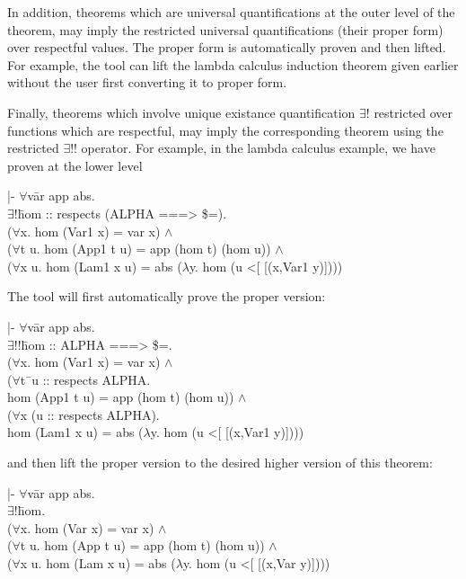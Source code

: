 \documentclass[envcountsame,runningheads]{llncs}
\begin{document}
In addition, theorems which are universal quantifications
at the outer level of the theorem, may
imply the restricted universal quantifications (their proper form)
over respectful values. 
The proper form is automatically proven and then lifted.
For example, the tool can lift the 
lambda calculus induction theorem given earlier without the user first
converting it to proper form.

Finally, theorems which involve unique existance
quantification $\exists$! restricted over functions which are respectful,
may imply the corresponding theorem using the
restricted $\exists$!!
operator.  For example, in the lambda 
calculus example, we have proven
at the lower level
{\tt \begin{tabbing}
 |- $\forall$v\=ar app abs. \\
\>    $\exists !$\=hom :: respects (ALPHA ===> \$=). \\
\>\>    ($\forall$x. hom (Var1 x) = var x) $\wedge$ \\
\>\>    ($\forall$t u. hom (App1 t u) = app (hom t) (hom u)) $\wedge$ \\
\>\>    ($\forall$x u. hom (Lam1 x u) = abs ($\lambda$y. hom (u <[ [(x,Var1 y)])))
\end{tabbing}}

\noindent
The tool will first automatically prove the proper version:
{\tt \begin{tabbing}
 |- $\forall$v\=ar app abs. \\
\>    $\exists !!$\=hom :: ALPHA ===> \$=. \\
\>\>    ($\forall$x. hom (Var1 x) = var x) $\wedge$ \\
\>\>    ($\forall$t\=\ u :: respects ALPHA. \\
\>\>\>     hom (App1 t u) = app (hom t) (hom u)) $\wedge$ \\
\>\>    ($\forall$x (u :: respects ALPHA). \\
\>\>\>     hom (Lam1 x u) = abs ($\lambda$y. hom (u <[ [(x,Var1 y)])))
\end{tabbing}}

\noindent
and then lift the proper version to the desired higher version of this theorem:
{\tt \begin{tabbing}
 |- $\forall$v\=ar app abs. \\
\>    $\exists !$\=hom. \\
\>\>    ($\forall$x. hom (Var x) = var x) $\wedge$ \\
\>\>    ($\forall$t u. hom (App t u) = app (hom t) (hom u)) $\wedge$ \\
\>\>    ($\forall$x u. hom (Lam x u) = abs ($\lambda$y. hom (u <[ [(x,Var y)])))
\end{tabbing}}
\end{document}

